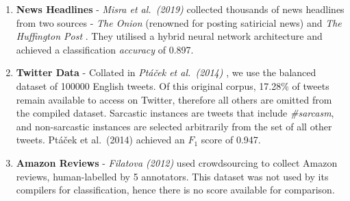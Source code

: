 \documentclass[12pt,a4paper]{article}
\begin{document}
\begin{enumerate}[leftmargin=0cm]
	\item \textbf{News Headlines} - \textit{Misra et al.\ (2019)} \cite{misra2019sarcasm} collected thousands of news headlines from two sources - \textit{The Onion} \footnotemark[4] (renowned for posting satiricial news) and \textit{The Huffington Post} \footnotemark[5]. They utilised a hybrid neural network architecture and achieved a classification \textit{accuracy} of 0.897.\vspace{-5pt}
	
	\item \textbf{Twitter Data} - Collated in \textit{Pt\'a\v{c}ek et al.\ (2014)} \cite{ptavcek2014sarcasm}, we use the balanced dataset of 100000 English tweets. Of this original corpus, 17.28\% of tweets remain available to access on Twitter, therefore all others are omitted from the compiled dataset. Sarcastic instances are tweets that include \textit{\#sarcasm}, and non-sarcastic instances are selected arbitrarily from the set of all other tweets. Pt\'a\v{c}ek et al.\ (2014) \cite{ptavcek2014sarcasm} achieved an $F_{1}$ score of 0.947.\vspace{-5pt}
	
	\item \textbf{Amazon Reviews} - \textit{Filatova (2012)} \cite{filatova2012irony} used crowdsourcing to collect Amazon reviews, human-labelled by 5 annotators. This dataset was not used by its compilers for classification, hence there is no score available for comparison.
\end{enumerate}

\end{document}
